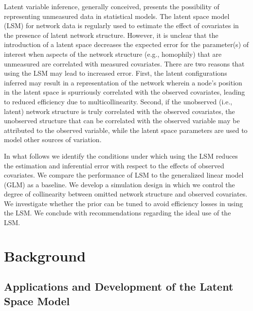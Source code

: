 \documentclass[12pt]{article}
\begin{document}
Latent variable inference, generally conceived, presents the possibility of representing unmeasured data in statistical models. The latent space model (LSM) \cite{hoff2002latent} for network data is regularly used to estimate the effect of covariates in the presence of latent network structure. However, it is unclear that the introduction of a latent space decreases the expected error for the parameter(s) of interest when aspects of the network structure (e.g., homophily) that are unmeasured are correlated with measured covariates. There are two reasons that using the LSM may lead to increased error. First, the latent configurations inferred may result in a representation of the network wherein a node's position in the latent space is spurriously correlated with the observed covariates, leading to reduced efficiency due to multicollinearity. Second, if the unobserved (i.e., latent) network structure is truly correlated with the observed covariates, the unobserved structure that can be correlated with the observed variable may be attributed to the observed variable, while the latent space parameters are used to model other sources of variation.

In what follows we identify the conditions under which using the LSM reduces the estimation and inferential error with respect to the effects of observed covariates. We compare the performance of LSM to the generalized linear model (GLM) as a baseline. We develop a simulation design in which we control the degree of collinearity between omitted network structure and observed covariates. We investigate whether the prior can be tuned to avoid efficiency losses in using the LSM. We conclude with recommendations regarding the ideal use of the LSM.

\section{Background}

\subsection{Applications and Development of the Latent Space Model}
\end{document}
